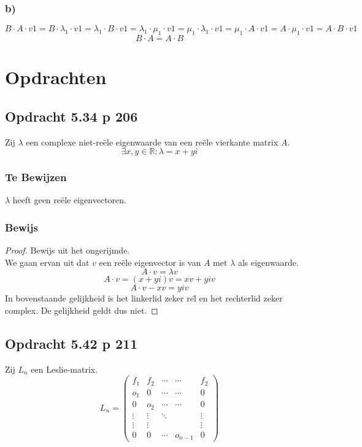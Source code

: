 \documentclass[lineaire_algebra_oplossingen.tex]{subfiles}
\begin{document}
\subsubsection*{b)}
\[
B\cdot A\cdot v1
= B\cdot \lambda_1\cdot v1
= \lambda_1\cdot B\cdot v1
= \lambda_1\cdot \mu_1\cdot v1
= \mu_1\cdot \lambda_1\cdot v1
= \mu_1\cdot A\cdot v1
= A\cdot \mu_1\cdot v1
= A\cdot B\cdot v1
\]
\[
B\cdot A = A\cdot B
\]


\section{Opdrachten}


\subsection{Opdracht 5.34 p 206}
\label{5.34}
Zij $\lambda$ een complexe niet-re\"ele eigenwaarde van een re\"ele vierkante matrix $A$.
\[
\exists x,y \in \mathbb{R}: \lambda = x +yi
\]

\subsubsection*{Te Bewijzen}
$\lambda$ heeft geen re\"ele eigenvectoren.

\subsubsection*{Bewijs}
\begin{proof}
Bewijs uit het ongerijmde.\\
We gaan ervan uit dat $v$ een re\"ele eigenvector is van $A$ met $\lambda$ als eigenwaarde.
\[
A\cdot v = \lambda v
\]
\[
A\cdot v = (x+yi) v= xv + yiv
\]
\[
A\cdot v - xv = yiv
\]
In bovenstaande gelijkheid is het linkerlid zeker re\"l en het rechterlid zeker complex.
De gelijkheid geldt dus niet. 
\end{proof}


\subsection{Opdracht 5.42 p 211}
\label{5.42}
Zij $L_n$ een Leslie-matrix.
\[
L_n =
\begin{pmatrix}
f_1 & f_2 & \cdots & \cdots & f_2\\
o_1 & 0 & \cdots & \cdots & 0\\
0 & o_2 & \cdots & \cdots & 0\\
\vdots & \vdots & \ddots & & \vdots\\
\vdots & \vdots & & & \vdots\\
0 & 0 & \cdots & o_{n-1} & 0
\end{pmatrix}
\]
\end{document}
